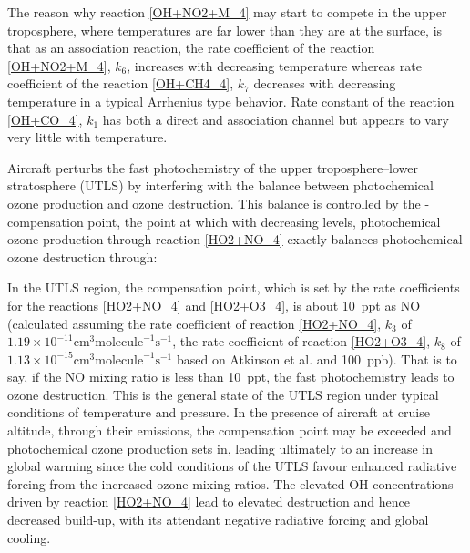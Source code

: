 

The reason why reaction \eqref{OH+NO2+M_4} may start to compete in the upper troposphere, where temperatures are far lower than they are at the surface, is that as an association reaction, the rate coefficient of the reaction \eqref{OH+NO2+M_4}, $k_6$, increases with decreasing temperature \cite{Atkinson2004, Butkovskaya2005} whereas rate coefficient of the reaction \eqref{OH+CH4_4}, $k_7$ decreases with decreasing temperature \cite{Atkinson2003} in a typical Arrhenius type behavior. Rate constant of the reaction \eqref{OH+CO_4}, $k_1$ has both a direct and association channel but appears to vary very little with temperature.

Aircraft  perturbs the fast photochemistry of the upper troposphere--lower stratosphere (UTLS) by interfering with the balance between photochemical ozone production and ozone destruction. This balance is controlled by the -compensation point, the point at which with decreasing  levels, photochemical ozone production through reaction \eqref{HO2+NO_4} exactly balances photochemical ozone destruction through:


In the UTLS region, the  compensation point, which is set by the rate coefficients for the reactions \eqref{HO2+NO_4} and \eqref{HO2+O3_4}, is about 10~ppt as NO (calculated assuming the rate coefficient of reaction \eqref{HO2+NO_4}, $k_3$ of $1.19 \times 10^{-11} \text{cm}^3 \text{molecule}^{-1} \text{s}^{-1}$, the rate coefficient of reaction \eqref{HO2+O3_4}, $k_8$ of $1.13 \times 10^{-15} \text{cm}^3 \text{molecule}^{-1} \text{s}^{-1}$ based on Atkinson et al. \cite{Atkinson2004} and  100~ppb). That is to say, if the NO mixing ratio is less than 10~ppt, the fast  photochemistry leads to ozone destruction. This is the general state of the UTLS region under typical conditions of temperature and pressure. In the presence of aircraft at cruise altitude, through their  emissions, the  compensation point may be exceeded and photochemical ozone production sets in, leading ultimately to an increase in global warming since the cold conditions of the UTLS favour enhanced radiative forcing from the increased ozone mixing ratios. The elevated OH concentrations driven by reaction \eqref{HO2+NO_4} lead to elevated  destruction and hence decreased build-up, with its attendant negative radiative forcing and global cooling.

